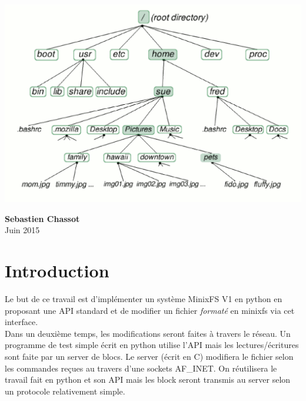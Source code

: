 \documentclass[a4paper,12pt]{article}
\begin{document}
\vspace{3cm}
\centerline{\includegraphics[scale=0.52]{imgs/illustration_FS}}
\vspace{2cm}

\begin{center}
\textbf{Sebastien Chassot} \\ Juin 2015
\end{center}

\thispagestyle{empty} %

\newpage %
\tableofcontents %
\listoffigures
\listoftables
\newpage %



\section{Introduction}

Le but de ce travail est d'implémenter un système MinixFS V1 en python en proposant une API standard et de modifier un fichier \emph{formaté} en minixfs via cet interface.\\

Dans un deuxième temps, les modifications seront faites à travers le réseau. Un programme de test simple écrit en python utilise l'API mais les lectures/écritures sont faite par un server de blocs. Le server (écrit en C) modifiera le fichier selon les commandes reçues au travers d'une sockets AF\_INET. On réutilisera le travail fait en python et son API mais les block seront transmis au server selon un protocole relativement simple.
 
\end{document}

